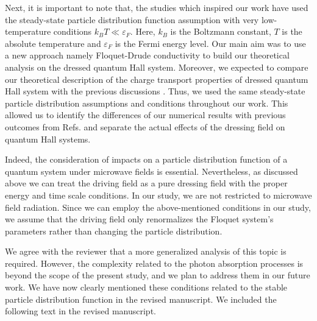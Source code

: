 \documentclass{article}
\begin{document}
Next, it is important to note that, the studies \cite{wackerl20,wackerlthesis20,dini16,endo09} which inspired our work have  used the steady-state particle distribution function assumption with very low-temperature conditions $k_B T \ll \varepsilon_F$. Here, $k_B$ is the Boltzmann constant, $T$ is the absolute temperature and $\varepsilon_F$ is the Fermi energy level.
Our main aim was to use a new approach namely Floquet-Drude conductivity \cite{wackerl20} to build our theoretical analysis on the dressed quantum Hall system.
Moreover, we expected to compare our theoretical description of the charge transport properties of dressed quantum Hall system with the previous discussions \cite{dini16,endo09}. Thus, we used the same steady-state particle distribution assumptions and conditions throughout our work.
This allowed us to identify the differences of our numerical results with previous outcomes from Refs. \cite{dini16,endo09} and separate the actual effects of the dressing field on quantum Hall systems.

Indeed, the consideration of impacts on a particle distribution function of a quantum system under microwave fields is essential. Nevertheless, as discussed above we can treat the driving field as a pure dressing field with the proper energy and time scale conditions. In our study, we are not restricted to microwave field radiation. Since we can employ the above-mentioned conditions in our study, we assume that the driving field only renormalizes the Floquet system's parameters rather than changing the particle distribution.

We agree with the reviewer that a more generalized analysis of this topic is required. However, the complexity related to the photon absorption processes is beyond the scope of the present study, and we plan to address them in our future work. We have now clearly mentioned these conditions related to the stable particle distribution function in the revised manuscript. We included the following text in the revised manuscript.
\end{document}
